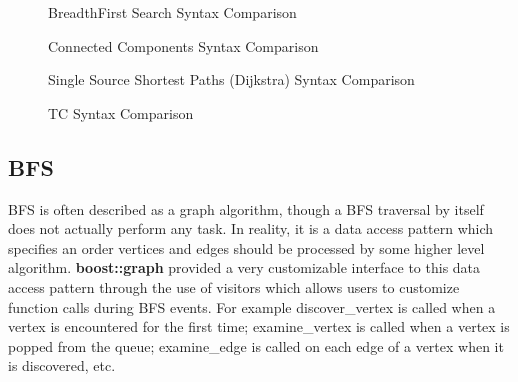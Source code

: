 \begin{figure}[ht]
\noindent\begin{minipage}{.499\textwidth}
{\small
      
}
\end{minipage}\hfill
\begin{minipage}{.499\textwidth}
{\small
      
}
\end{minipage}
\caption{Breadth\-First Search Syntax Comparison}
\label{fig:bfssyntax}
\end{figure}
\begin{figure}[ht]
\noindent\begin{minipage}{.499\textwidth}
{\small
      
}
\end{minipage}\hfill
\begin{minipage}{.499\textwidth}
{\small
      
}
\end{minipage}
\caption{Connected Components Syntax Comparison}
\label{fig:ccsyntax}
\end{figure}

\begin{figure}[ht]
\noindent\begin{minipage}{.499\textwidth}
{\small
      
}
\end{minipage}\hfill
\begin{minipage}{.499\textwidth}
{\small
      
}
\end{minipage}
\caption{Single Source Shortest Paths (Dijkstra) Syntax Comparison}
\label{fig:ssspsyntax}
\end{figure}

\begin{figure}[ht]
\noindent\begin{minipage}{.499\textwidth}
{\small
      
}
\end{minipage}\hfill
\begin{minipage}{.499\textwidth}
{\small
      
}
\end{minipage}
\caption{TC Syntax Comparison}
\label{fig:tcsyntax}
\end{figure}

\subsection{BFS}
BFS is often described as a graph algorithm, though a BFS traversal
by itself does not actually perform any task.
In reality, it is a data access pattern which specifies an order
vertices and edges should be processed by some higher level algorithm.
\textbf{boost::graph} provided a very customizable interface to this
data access pattern through the use of visitors which allows users
to customize function calls during BFS events.
For example discover\_vertex is called when a vertex is encountered for the
first time; examine\_vertex is called when a vertex is popped from the queue;
examine\_edge is called on each edge of a vertex when it is discovered, etc.

